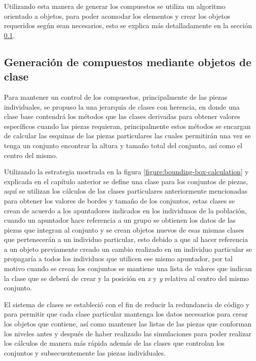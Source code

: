 Utilizando esta manera de generar los compuestos se utiliza un
algoritmo orientado a objetos, para poder acomodar los elementos y crear los objetos
requeridos según sean necesarios, esto se explica más detalladamente en la
sección \ref{subsection:classorientedidea}.

\subsection{Generación de compuestos mediante objetos de clase}
\label{subsection:classorientedidea}

Para mantener un control de los compuestos, principalmente de las piezas
individuales, se propuso la una jerarquía de clases con
herencia, en donde una clase base contendrá los métodos que las clases derivadas
para obtener valores específicos cuando las piezas requieran,
principalmente estos métodos se encargan de calcular las esquinas de las piezas
particulares las cuales permitirán una vez se tenga un conjunto encontrar la
altura y tamaño total del conjunto, así como el centro del mismo.

Utilizando la estrategia mostrada en la figura
\ref{figure:bounding-box-calculation} y explicada en el capítulo anterior se
define una clase para los conjuntos de piezas, aquí se utilizan los cálculos de
las clases particulares anteriormente mencionadas para obtener los valores de
bordes y tamaño de los conjuntos, estas clases se crean de acuerdo a los
apuntadores indicados en los individuaos de la población, cuando un apuntador
hace referencia a un grupo se obtienen los datos de las piezas que integran al
conjunto y se crean objetos nuevos de esas mismas clases que pertenecerán a un
individuo particular, esto debido a que al hacer referencia a un objeto
previamente creado un cambio realizado en un individuo particular se propagaría
a todos los individuos que utilicen ese mismo apuntador, por tal motivo cuando
se crean los conjuntos se mantiene una lista de valores que indican la clase que
se deberá de crear y la posición en \textit{x} y \textit{y} relativa al centro
del mismo conjunto.

El sistema de clases se estableció con el fin de reducir la redundancia de
código y para permitir que cada clase particular mantenga los datos necesarios
para crear los objetos que contiene, así como mantener las listas de las piezas
que conforman los niveles antes y después de haber realizado las simulaciones
para poder realizar los cálculos de manera más rápida además de las clases que
controlan los conjuntos y subsecuentemente las piezas individuales. 

